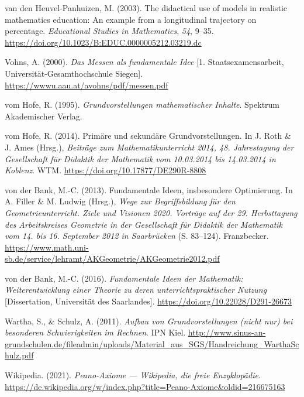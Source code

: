 \documentclass[
]{scrbook}
\newlength{\cslhangindent}
\newlength{\cslentryspacingunit} %
\newenvironment{CSLReferences}[2] %
 {%
  \setlength{\parindent}{0pt}
  \ifodd #1
  \let\oldpar\par
  \def\par{\hangindent=\cslhangindent\oldpar}
  \fi
  \setlength{\parskip}{#2\cslentryspacingunit}
 }%
 {}
\theoremstyle{definition}
\theoremstyle{definition}
\theoremstyle{definition}
\theoremstyle{definition}
\theoremstyle{remark}
\begin{document}
\begin{CSLReferences}{1}{0}
\leavevmode{}%
van den Heuvel-Panhuizen, M. (2003). The didactical use of models in realistic mathematics education: {An} example from a longitudinal trajectory on percentage. \emph{Educational Studies in Mathematics}, \emph{54}, 9--35. \url{https://doi.org/10.1023/B:EDUC.0000005212.03219.dc}

\leavevmode{}%
Vohns, A. (2000). \emph{Das {Messen} als fundamentale {Idee}} {[}1. Staatsexamensarbeit, Universität-Gesamthochschule Siegen{]}. \url{https://wwwu.aau.at/avohns/pdf/messen.pdf}

\leavevmode{}%
vom Hofe, R. (1995). \emph{Grundvorstellungen mathematischer {Inhalte}}. Spektrum Akademischer Verlag.

\leavevmode{}%
vom Hofe, R. (2014). Primäre und sekundäre {Grundvorstellungen}. In J. Roth \& J. Ames (Hrsg.), \emph{Beiträge zum {Mathematikunterricht} 2014, 48. {Jahrestagung} der {Gesellschaft} für {Didaktik} der {Mathematik} vom 10.03.2014 bis 14.03.2014 in {Koblenz}}. WTM. \url{https://doi.org/10.17877/DE290R-8808}

\leavevmode{}%
von der Bank, M.-C. (2013). Fundamentale {Ideen}, insbesondere {Optimierung}. In A. Filler \& M. Ludwig (Hrsg.), \emph{Wege zur {Begriffsbildung} für den {Geometrieunterricht}. {Ziele} und {Visionen} 2020. {Vorträge} auf der 29. {Herbsttagung} des {Arbeitskreises} {Geometrie} in der {Gesellschaft} für {Didaktik} der {Mathematik} vom 14. bis 16. {September} 2012 in {Saarbrücken}} (S. 83--124). Franzbecker. \url{https://www.math.uni-sb.de/service/lehramt/AKGeometrie/AKGeometrie2012.pdf}

\leavevmode{}%
von der Bank, M.-C. (2016). \emph{Fundamentale {Ideen} der {Mathematik}: {Weiterentwicklung} einer {Theorie} zu deren unterrichtspraktischer {Nutzung}} {[}Dissertation, Universität des Saarlandes{]}. \url{https://doi.org/10.22028/D291-26673}

\leavevmode{}%
Wartha, S., \& Schulz, A. (2011). \emph{Aufbau von {Grundvorstellungen} (nicht nur) bei besonderen {Schwierigkeiten} im {Rechnen}}. IPN Kiel. \url{http://www.sinus-an-grundschulen.de/fileadmin/uploads/Material_aus_SGS/Handreichung_WarthaSchulz.pdf}

\leavevmode{}%
Wikipedia. (2021). \emph{Peano-Axiome --- Wikipedia{,} die freie Enzyklopädie}. \url{https://de.wikipedia.org/w/index.php?title=Peano-Axiome\&oldid=216675163}


\end{CSLReferences}
\end{document}
